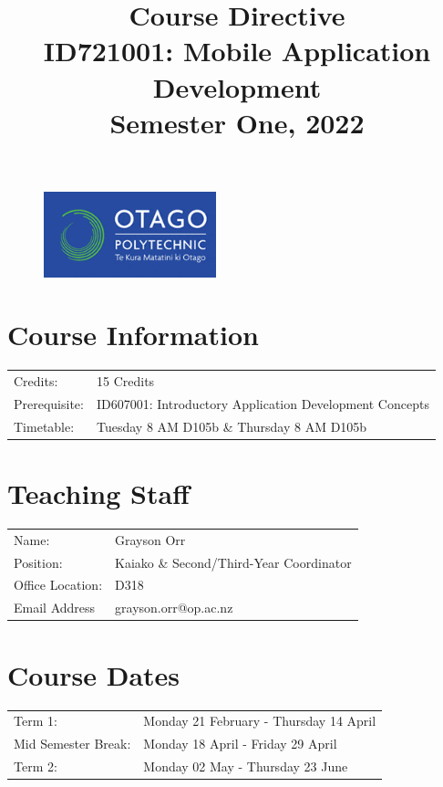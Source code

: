 \documentclass{article}
\author{}
\begin{document}
\begin{figure}
	\includegraphics[width=50mm]{../../resources/img/logo.png}
\end{figure}

\title{Course Directive\\ID721001: Mobile Application Development\\Semester One, 2022}
\date{}
\maketitle

\section*{Course Information}
\begin{tabular}{ll}
	Credits:      & 15 Credits                                              \\
	Prerequisite: & ID607001: Introductory Application Development Concepts \\
	Timetable:    & Tuesday 8 AM D105b \& Thursday 8 AM D105b
\end{tabular}

\section*{Teaching Staff}
\begin{tabular}{ll}
	Name:            & Grayson Orr                             \\
	Position:        & Kaiako \& Second/Third-Year Coordinator \\
	Office Location: & D318                                    \\
	Email Address    & grayson.orr@op.ac.nz                    \\
\end{tabular}

\section*{Course Dates}
\begin{tabular}{ll}
	Term 1:             & Monday 21 February - Thursday 14 April \\
	Mid Semester Break: & Monday 18 April - Friday 29 April      \\
	Term 2:             & Monday 02 May - Thursday 23 June       \\
\end{tabular}
\end{document}
